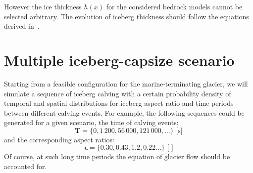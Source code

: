 \documentclass[a4paper,11pt]{article}
\renewcommand{\vec}[1]{\boldsymbol{#1}}
\begin{document}
However the ice thickness $h(x)$ for the considered bedrock models cannot be selected arbitrary. The evolution of iceberg thickness should follow the equations derived in~\parencite{muszynski1987coupled,schoof2007marine,tsai2015marine}.

\section{Multiple iceberg-capsize scenario}

Starting from a feasible configuration for the marine-terminating glacier, we will simulate a sequence of iceberg calving with a certain probability density of temporal and spatial distributions for iceberg aspect ratio and time periods between different calving events. For example, the following sequences could be generated for a given scenario, the time of calving events:
\[
 \vec T = \{0, 1\,200, 56\,000, 121\,000, \dots \} \text{ [s]}
\]
and the corresponding aspect ratios:
\[
 \vec \epsilon = \{0.30, 0.43, 1.2, 0.22 \dots \} \text{ [-]}
\]
Of course, at such long time periods the equation of glacier flow should be accounted for.



\printbibliography[heading=bibintoc]
\end{document}
